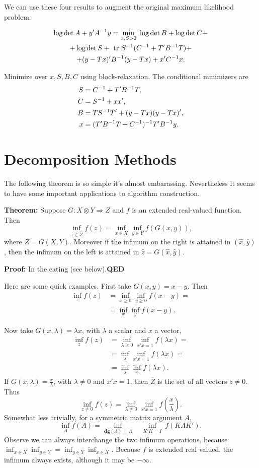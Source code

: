 \documentclass[
  12pt,
]{book}
\begin{document}
We can use these four results to augment the original maximum likelihood problem.

\begin{multline*}
\log\det{A}+y'A^{-1}y=\min_{x,S>0}\ \log\det{B}+\log\det{C}+\\
+\log\det{S}+\hbox{ tr }S^{-1}(C^{-1}+T'B^{-1}T)+\\
+(y-Tx)'B^{-1}(y-Tx)+x'C^{-1}x.
\end{multline*}

Minimize over \(x,S,B,C\) using block-relaxation. The conditional minimizers
are
\begin{align*}
S&=C^{-1}+T'B^{-1}T,\notag\\
C&=S^{-1}+xx',\notag\\
B&=TS^{-1}T'+(y-Tx)(y-Tx)',\notag\\
x&=(T'B^{-1}T+C^{-1})^{-1}T'B^{-1}y.\notag
\end{align*}

\hypertarget{decomposition-methods}{%
\section{Decomposition Methods}\label{decomposition-methods}}

The following theorem is so simple it's almost embarassing. Nevertheless
it seems to have some important applications to algorithm construction.

\textbf{Theorem:}
Suppose \(G: X\otimes Y\Rightarrow Z\) and \(f\) is an extended real-valued function.
Then
\[
\inf_{z\in\overline{Z}} f(z)=\inf_{x\in X}\inf_{y\in Y} f(G(x,y)),
\]
where \(\overline{Z}=G(X,Y)\). Moreover if the infimum on the right is attained in \((\hat x,\hat y)\),
then the infimum on the left is attained in \(\hat z=G(\hat x,\hat y)\).

\textbf{Proof:} In the eating (see below).\textbf{QED}

Here are some quick examples. First take \(G(x,y)=x-y\). Then
\begin{align*}
\inf_{z}f(z)&=\inf_{x\geq 0}\inf_{y\geq 0}f(x-y)=\\
&=\inf_{x}\inf_{y}f(x-y).
\end{align*}

Now take \(G(x,\lambda)=\lambda x\), with \(\lambda\) a scalar and \(x\) a vector,
\begin{align*}
\inf_{z}f(z)&=\inf_{\lambda\geq 0}\inf_{x'x=1}f(\lambda x)=\\
&=\inf_{\lambda}\inf_{x'x=1}f(\lambda x)=\\
&=\inf_{\lambda}\inf_{x}f(\lambda x).
\end{align*}
If \(G(x,\lambda)=\frac{x}{\lambda}\), with \(\lambda\not= 0\) and \(x'x=1\), then \(\overline Z\) is the set of all vectors \(z\not= 0\). Thus
\[
\inf_{z\not= 0}f(z)=\inf_{\lambda\not= 0}\inf_{x'x=1}f(\frac{x}{\lambda}).
\]
Somewhat less trivially, for a symmetric matrix argument \(A\),
\[
\inf_{A}f(A)=\inf_{\mathbf{dg}(\Lambda)=\Lambda}\quad\inf_{K'K=I}\ f(K\Lambda K').
\]
Observe we can always interchange the two infimum operations,
because \(\inf_{x\in X}\inf_{y\in Y}=\inf_{y\in Y}\inf_{x\in X}\). Because \(f\) is extended real valued, the infimum always
exists, although it may be \(-\infty\).
\end{document}
